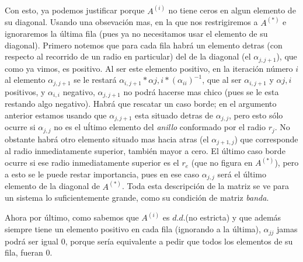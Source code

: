 \\
\\
Con esto, ya podemos justificar porque $A^{(i)}$ no tiene ceros en algun elemento de su diagonal. Usando una obsevaci\'on mas, en la que nos restrigiremos a $A^{(*)}$ e ignoraremos la \'ultima fila (pues ya no necesitamos usar el elemento de su diagonal).
Primero notemos que para cada fila habr\'a un elemento detras (con respecto al recorrido de un radio en particular) del de la diagonal (el $\alpha_{j,j+1}$), que como ya vimos, es positivo. Al ser este elemento positivo, en la iteraci\'on n\'umero $i$ al elemento $\alpha_{j,j+1}$ se le restar\'a $\alpha_{i,j+1}*\alpha{j,i}*(\alpha_{ii})^{-1}$, que al ser $\alpha_{i,j+1}$ y $\alpha{j,i}$ positivos, y $\alpha_{i,i}$ negativo, $\alpha_{j,j+1}$ no podr\'a hacerse mas chico (pues se le esta restando algo negativo). Habrá que rescatar un caso borde; en el argumento anterior estamos usando que $\alpha_{j,j+1}$ esta situado detras de $\alpha_{j,j}$, pero esto s\'olo ocurre si $\alpha_{j,j}$ no es el u\'ltimo elemento del \textit{anillo} conformado por el radio $r_{j}$. No obstante habrá otro elemento situado mas hacia atras (el $\alpha_{j+1,j}$) que corresponde al radio inmediatamente superior, tambi\'en mayor a cero. El \'ultimo caso borde ocurre si ese radio inmediatamente superior es el $r_e$ (que no figura en $A^{(*)}$), pero a esto se le puede restar importancia, pues en ese caso $\alpha_{j,j}$ ser\'a el \'ultimo elemento de la diagonal de $A^{(*)}$. Toda esta descripci\'on de la matriz se ve para un sistema lo suficientemente grande, como su condici\'on de matriz \textit{banda}. 

Ahora por \'ultimo, como sabemos que $A^{(i)}$ es $d.d.$(no estricta) y que adem\'as siempre tiene un elemento positivo en cada fila (ignorando a la \'ultima), $\alpha_{jj}$ jamas podr\'a ser igual $0$, porque ser\'ia equivalente a pedir que todos los elementos de su fila, fueran $0$.

 
